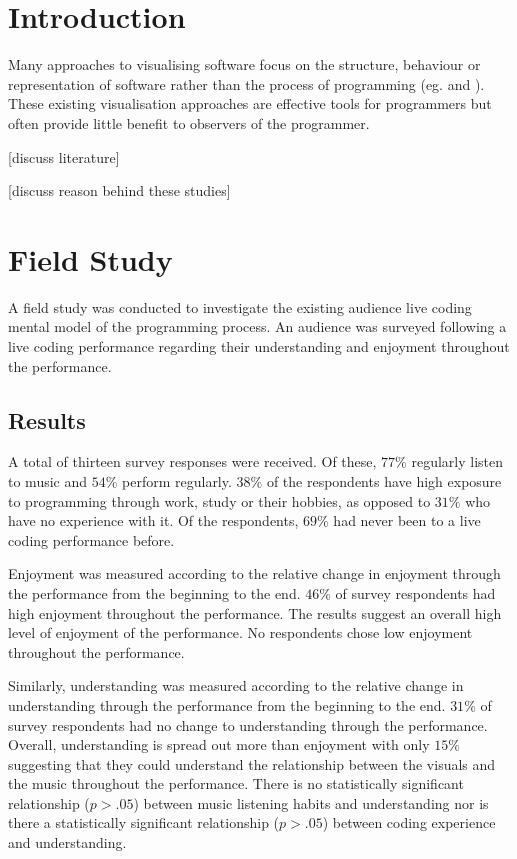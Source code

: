\documentclass{sig-alternate}
\begin{document}



\section{Introduction}

Many approaches to visualising software focus on the structure, behaviour or representation of software rather than the process of programming (eg. \cite{Ball1996} and \cite{Price1992}). These existing visualisation approaches are effective tools for programmers but often provide little benefit to observers of the programmer.

{\color{red}[discuss literature]}

{\color{red}[discuss reason behind these studies]}

\section{Field Study}

A field study was conducted to investigate the existing audience live coding mental model of the programming process. An audience was surveyed following a live coding performance regarding their understanding and enjoyment throughout the performance.

\subsection{Results}

A total of thirteen survey responses were received. Of these, $77\%$ regularly listen to music and $54\%$ perform regularly. $38\%$ of the respondents have high exposure to programming through work, study or their hobbies, as opposed to $31\%$ who have no experience with it. Of the respondents, $69\%$ had never been to a live coding performance before.

Enjoyment was measured according to the relative change in enjoyment through the performance from the beginning to the end. $46\%$ of survey respondents had high enjoyment throughout the performance. The results suggest an overall high level of enjoyment of the performance. No respondents chose low enjoyment throughout the performance.

Similarly, understanding was measured according to the relative change in understanding through the performance from the beginning to the end. $31\%$ of survey respondents had no change to understanding through the performance. Overall, understanding is spread out more than enjoyment with only $15\%$ suggesting that they could understand the relationship between the visuals and the music throughout the performance. There is no statistically significant relationship ($p > .05$) between music listening habits and understanding nor is there a statistically significant relationship ($p > .05$) between coding experience and understanding.
\end{document}
